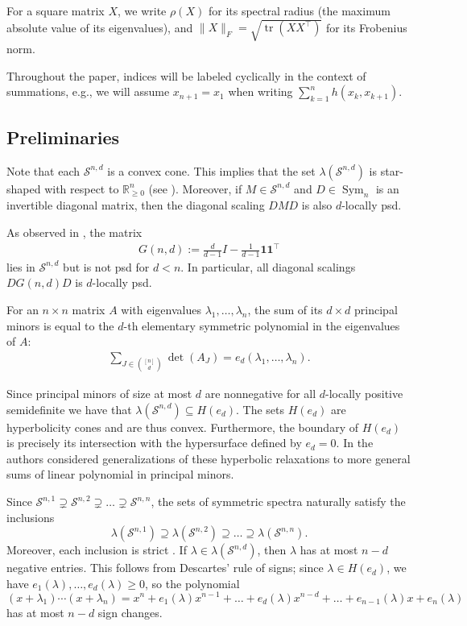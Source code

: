 \documentclass[reqno,hidelinks,11pt]{amsart}
\numberwithin{equation}{section}
\def\RR{\mathbb{R}}
\def\S{\mathcal{S}}
\def\Sym{\operatorname{Sym}}
\def\tr{\operatorname{tr}}
\begin{document}
For a square matrix $X$, we write $\rho(X)$ for its spectral radius (the maximum absolute value of its eigenvalues), and $\|X\|_F = \sqrt{\tr (XX^\top)}$ for its Frobenius norm. 

Throughout the paper, indices will be labeled cyclically in the context of summations, e.g., we will assume $x_{n + 1}=x_1$ when writing $\sum_{k=1}^n h(x_k, x_{k + 1})$.

\subsection{Preliminaries}

Note that each $\S^{n,d}$ is a convex cone. This implies that the set $\lambda(\S^{n,d})$ is star-shaped with respect to $\RR_{\geq 0}^n$ (see \cite[Proposition~1.4]{kozhasov2023eigenvalues}). 
Moreover, if $M \in \S^{n,d}$ and $D \in \Sym_n$ is an invertible diagonal matrix, then the diagonal scaling $DMD$ is also $d$-locally psd. 

As observed in \cite{blekherman2022hyperbolic}, the matrix 
\begin{align}\label{eq: G(n,d)}
G(n, d):= \frac{d}{d-1}I - \frac{1}{d-1}\mathbf{1}\mathbf{1}^\top
\end{align}
lies in $\S^{n, d}$ but is not psd for $d < n$. In particular, all diagonal scalings $DG(n,d)D$ is $d$-locally psd. 

For an $n\times n$ matrix $A$ with eigenvalues $\lambda_1,\ldots,\lambda_n$, the sum of its $d \times d$ principal minors is equal to the $d$-th elementary symmetric polynomial in the eigenvalues of $A$:
\begin{align}\label{eq: det(A) in eigenvalues}
\sum_{J \in \binom{[n]}{d}}\det(A_J) = e_d(\lambda_1,\ldots,\lambda_n).    
\end{align}

Since principal minors of size at most $d$ are nonnegative for all $d$-locally positive semidefinite we have that $\lambda(\S^{n,d})\subseteq H(e_d)$. The sets $H(e_d)$ are hyperbolicity cones and are thus convex. Furthermore, the boundary of $H(e_d)$ is precisely its intersection with the hypersurface defined by $e_d=0$. In \cite{MR4681290} the authors considered generalizations of these hyperbolic relaxations to more general sums of linear polynomial in principal minors.

Since $\S^{n,1}\supsetneq\S^{n,2}\supsetneq\dots\supsetneq\S^{n,n}$, the sets of symmetric spectra naturally satisfy the inclusions 
\[\lambda(\S^{n,1})\supseteq \lambda(\S^{n,2})\supseteq \dots\supseteq \lambda(\S^{n,n}).\]
Moreover, each inclusion is strict \cite{blekherman2022hyperbolic}.
If $\lambda \in \lambda(\S^{n, d})$, then $\lambda$ has at most $n-d$ negative entries. This follows from Descartes' rule of signs; since $\lambda \in H(e_d)$, we have $e_1(\lambda),\dots ,e_d(\lambda)\ge0$, so the polynomial \[(x+\lambda_1)\cdots(x+\lambda_n)=x^n+e_1(\lambda)x^{n-1}+\dots+e_d(\lambda)x^{n-d}+\dots+e_{n-1}(\lambda)x+e_n(\lambda)\] has at most $n-d$ sign changes.
\end{document}
